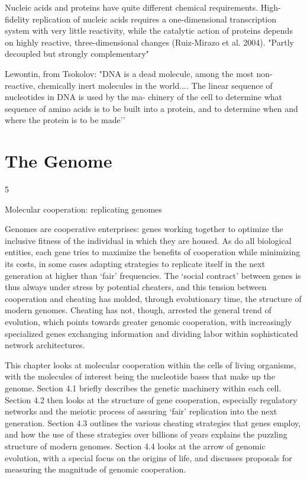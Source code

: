 \documentclass{tufte-book} %
\begin{document}
Nucleic acids and proteins have quite different chemical requirements. High-fidelity replication of nucleic acids requires a one-dimensional transcription system with very little reactivity, while the catalytic action of proteins depends on highly reactive, three-dimensional changes (Ruiz-Mirazo et al. 2004). "Partly decoupled but strongly complementary"

Lewontin, from Tsokolov: "DNA is a dead molecule, among the most non- reactive, chemically inert molecules in the world.... The linear sequence of nucleotides in DNA is used by the ma- chinery of the cell to determine what sequence of amino acids is to be built into a protein, and to determine when and where the protein is to be made’’





\chapter{The Genome}\label{genome}

5

Molecular cooperation: replicating genomes


Genomes are cooperative enterprises: genes working together to optimize the inclusive fitness of the individual in which they are housed. As do all biological entities, each gene tries to maximize the benefits of cooperation while minimizing its costs, in some cases adapting strategies to replicate itself in the next generation at higher than ‘fair’ frequencies. The ‘social contract’ between genes is thus always under stress by potential cheaters, and this tension between cooperation and cheating has molded, through evolutionary time, the structure of modern genomes. Cheating has not, though, arrested the general trend of evolution, which points towards greater genomic cooperation, with increasingly specialized genes exchanging information and dividing labor within sophisticated network architectures.

This chapter looks at molecular cooperation within the cells of living organisms, with the molecules of interest being the nucleotide bases that make up the genome. Section 4.1 briefly describes the genetic machinery within each cell. Section 4.2 then looks at the structure of gene cooperation, especially regulatory networks and the meiotic process of assuring ‘fair’ replication into the next generation. Section 4.3 outlines the various cheating strategies that genes employ, and how the use of these strategies over billions of years explains the puzzling structure of modern genomes. Section 4.4 looks at the arrow of genomic evolution, with a special focus on the origins of life, and discusses proposals for measuring the magnitude of genomic cooperation.
\end{document}
